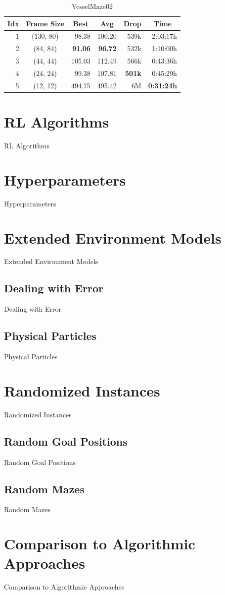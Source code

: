 \begin{table}[htp]
    \begin{center}
        \begin{tabular}{rcrrrr}
            \toprule
            \multicolumn{1}{c}{Idx} & \multicolumn{1}{c}{Frame Size} & \multicolumn{1}{c}{Best} & \multicolumn{1}{c}{Avg} & \multicolumn{1}{c}{Drop} & \multicolumn{1}{c}{Time}\\
            \midrule
            1 & (130, 80) & 98.38 & 100.20 & 539k & 2:03:17h \\
            2 & (84, 84) & \textbf{91.06} & \textbf{96.72} & 532k & 1:10:00h \\
            3 & (44, 44) & 105.03 & 112.49 & 566k & 0:43:36h \\
            4 & (24, 24) & 99.38 & 107.81 & \textbf{501k} & 0:45:29h \\
            5 & (12, 12) & 494.75 & 495.42 & 6M & \textbf{0:31:24h} \\
            \bottomrule
        \end{tabular}
    \end{center}
    \caption{VesselMaze02}
\end{table}

\section{RL Algorithms} \label{sec:EvalRLAlgorithms}
RL Algorithms
\section{Hyperparameters} \label{sec:EvalParameters}
Hyperparameters
\section{Extended Environment Models} \label{sec:EvalExtendedModels}
Extended Environment Models
\subsection{Dealing with Error} \label{sec:EvalError}
Dealing with Error
\subsection{Physical Particles} \label{sec:EvalPhysical}
Physical Particles
\section{Randomized Instances} \label{sec:EvalRandomness}
Randomized Instances
\subsection{Random Goal Positions} \label{sec:EvalRandomGoals}
Random Goal Positions
\subsection{Random Mazes} \label{sec:EvalRandomMaze}
Random Mazes
\section{Comparison to Algorithmic Approaches} \label{sec:EvalAlgorithms}
Comparison to Algorithmic Approaches